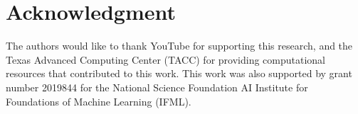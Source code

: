 \documentclass[journal]{IEEEtran}
\begin{document}
\section{Acknowledgment}
The authors would like to thank YouTube for supporting this research, and the Texas Advanced Computing Center (TACC) for providing computational resources that contributed to this work. This work was also supported by grant number 2019844 for the National Science Foundation AI Institute for Foundations of Machine Learning (IFML).



\end{document}
